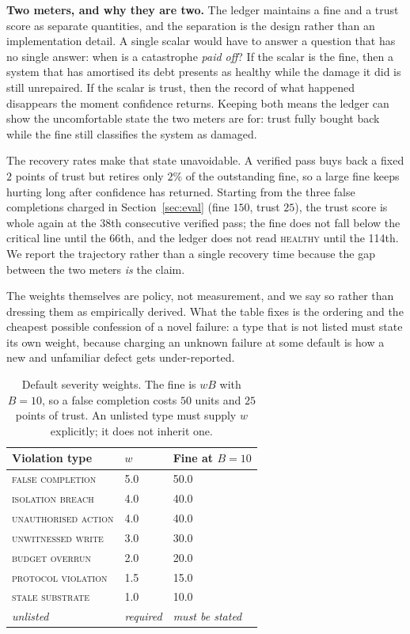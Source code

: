 \documentclass[conference]{IEEEtran}
\begin{document}
\textbf{Two meters, and why they are two.}
The ledger maintains a fine and a trust score as separate quantities, and the
separation is the design rather than an implementation detail. A single scalar
would have to answer a question that has no single answer: when is a
catastrophe \emph{paid off}? If the scalar is the fine, then a system that has
amortised its debt presents as healthy while the damage it did is still
unrepaired. If the scalar is trust, then the record of what happened disappears
the moment confidence returns. Keeping both means the ledger can show the
uncomfortable state the two meters are for: trust fully bought back while the
fine still classifies the system as damaged.

The recovery rates make that state unavoidable. A verified pass buys back a fixed
$2$ points of trust but retires only $2\%$ of the outstanding fine, so a large
fine keeps hurting long after confidence has returned. Starting from the three
false completions charged in Section~\ref{sec:eval} (fine $150$, trust $25$), the
trust score is whole again at the 38th consecutive verified pass; the fine does
not fall below the critical line until the 66th, and the ledger does not read
\textsc{healthy} until the 114th. We report the trajectory rather than a single
recovery time because the gap between the two meters \emph{is} the claim.

The weights themselves are policy, not measurement, and we say so rather than
dressing them as empirically derived. What the table fixes is the ordering and
the cheapest possible confession of a novel failure: a type that is not listed
must state its own weight, because charging an unknown failure at some default is
how a new and unfamiliar defect gets under-reported.

\begin{table}[t]
  \centering
  \caption{Default severity weights. The fine is $wB$ with $B=10$, so a false
  completion costs $50$ units and $25$ points of trust. An unlisted type must
  supply $w$ explicitly; it does not inherit one.}
  \label{tab:weights}
  \renewcommand{\arraystretch}{1.1}
  \setlength{\tabcolsep}{4pt}
  \begin{tabular}{@{}L{0.42\columnwidth}L{0.14\columnwidth}L{0.33\columnwidth}@{}}
    \toprule
    \textbf{Violation type} & \textbf{$w$} & \textbf{Fine at $B=10$} \\
    \midrule
    \textsc{false completion}     & 5.0 & 50.0 \\
    \textsc{isolation breach}     & 4.0 & 40.0 \\
    \textsc{unauthorised action}  & 4.0 & 40.0 \\
    \textsc{unwitnessed write}    & 3.0 & 30.0 \\
    \textsc{budget overrun}       & 2.0 & 20.0 \\
    \textsc{protocol violation}   & 1.5 & 15.0 \\
    \textsc{stale substrate}      & 1.0 & 10.0 \\
    \midrule
    \emph{unlisted}               & \emph{required} & \emph{must be stated} \\
    \bottomrule
  \end{tabular}
\end{table}
\end{document}
